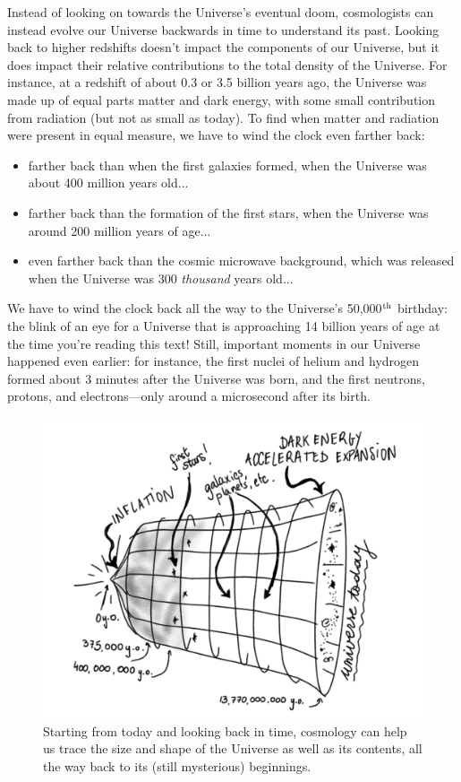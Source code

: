 Instead of looking on towards the Universe's eventual doom, cosmologists can instead evolve our Universe backwards in time to understand its past. Looking back to higher redshifts doesn't impact the components of our Universe, but it does impact their relative contributions to the total density of the Universe. For instance, at a redshift of about 0.3 or 3.5 billion years ago, the Universe was made up of equal parts matter and dark energy, with some small contribution from radiation (but not as small as today). To find when matter and radiation were present in equal measure, we have to wind the clock even farther back:
\begin{itemize}
    \item farther back than when the first galaxies formed, when the Universe was about 400 million years old...
    \item farther back than the formation of the first stars, when the Universe was around 200 million years of age...
    \item even farther back than the cosmic microwave background, which was released when the Universe was 300 \textit{thousand} years old... 
\end{itemize}
We have to wind the clock back all the way to the Universe's 50,000$^{\rm{th}}$ birthday: the blink of an eye for a Universe that is approaching 14 billion years of age at the time you're reading this text! Still, important moments in our Universe happened even earlier: for instance, the first nuclei of helium and hydrogen formed about 3 minutes after the Universe was born, and the first neutrons, protons, and electrons---only around a microsecond after its birth.  

\begin{figure}[h!]
    \centering
    \includegraphics[width=0.6\linewidth]{img/cosmology.png}
    \caption{Starting from today and looking back in time, cosmology can help us trace the size and shape of the Universe as well as its contents, all the way back to its (still mysterious) beginnings.}
    \label{fig:cosmology}
\end{figure}


